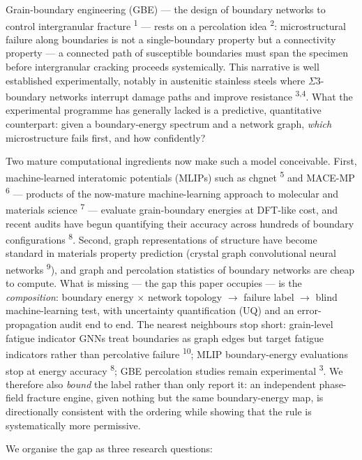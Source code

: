 \documentclass[11pt]{article}
\begin{document}
Grain-boundary engineering (GBE) --- the design of boundary networks to control intergranular fracture \textsuperscript{1} --- rests on a percolation idea \textsuperscript{2}: microstructural failure along boundaries is not a single-boundary property but a connectivity property --- a connected path of susceptible boundaries must span the specimen before intergranular cracking proceeds systemically. This narrative is well established experimentally, notably in austenitic stainless steels where $\Sigma$3-boundary networks interrupt damage paths and improve resistance \textsuperscript{3,4}. What the experimental programme has generally lacked is a predictive, quantitative counterpart: given a boundary-energy spectrum and a network graph, \textit{which} microstructure fails first, and how confidently?

Two mature computational ingredients now make such a model conceivable. First, machine-learned interatomic potentials (MLIPs) such as chgnet \textsuperscript{5} and MACE-MP \textsuperscript{6} --- products of the now-mature machine-learning approach to molecular and materials science \textsuperscript{7} --- evaluate grain-boundary energies at DFT-like cost, and recent audits have begun quantifying their accuracy across hundreds of boundary configurations \textsuperscript{8}. Second, graph representations of structure have become standard in materials property prediction (crystal graph convolutional neural networks \textsuperscript{9}), and graph and percolation statistics of boundary networks are cheap to compute. What is missing --- the gap this paper occupies --- is the \textit{composition}: boundary energy $\times$ network topology $\rightarrow$ failure label $\rightarrow$ blind machine-learning test, with uncertainty quantification (UQ) and an error-propagation audit end to end. The nearest neighbours stop short: grain-level fatigue indicator GNNs treat boundaries as graph edges but target fatigue indicators rather than percolative failure \textsuperscript{10}; MLIP boundary-energy evaluations stop at energy accuracy \textsuperscript{8}; GBE percolation studies remain experimental \textsuperscript{3}. We therefore also \textit{bound} the label rather than only report it: an independent phase-field fracture engine, given nothing but the same boundary-energy map, is directionally consistent with the ordering while showing that the rule is systematically more permissive.

We organise the gap as three research questions:
\end{document}
